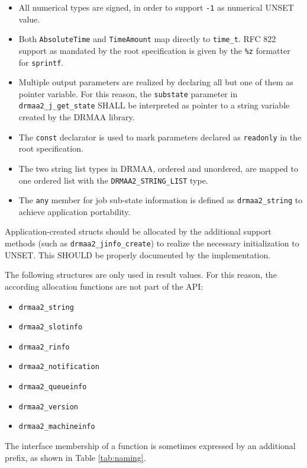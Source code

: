 \documentclass{article}
\newcommand{\h}[1]{\texttt{#1}}
\begin{document}
\begin{itemize}
\item  All numerical types are signed, in order to support \h{-1} as numerical UNSET value.
\item Both \h{AbsoluteTime} and \h{TimeAmount} map directly to \h{time\_t}. RFC 822 support as mandated by the root specification is given by the \h{\%z} formatter for \h{sprintf}.
\item Multiple output parameters are realized by declaring all but one of them as pointer variable. For this reason, the \h{substate} parameter in \h{drmaa2\_j\_get\_state} SHALL be interpreted as pointer to a string variable created by the DRMAA library.
\item The \h{const} declarator is used to mark parameters declared as \h{readonly} in the root specification.
\item The two string list types in DRMAA, ordered and unordered, are mapped to one ordered list with the \h{DRMAA2\_STRING\_LIST} type.
\item The \h{any} member for job sub-state information is defined as \h{drmaa2\_string} to achieve application portability.
\end{itemize}

Application-created structs should be allocated by the additional support methods (such as \h{drmaa2\_jinfo\_create}) to realize the necessary initialization to UNSET. This SHOULD be properly documented by the implementation.

The following structures are only used in result values. For this reason, the according allocation functions are not part of the API:

\begin{itemize}
\item \h{drmaa2\_string}
\item \h{drmaa2\_slotinfo}
\item \h{drmaa2\_rinfo}
\item \h{drmaa2\_notification}
\item \h{drmaa2\_queueinfo}
\item \h{drmaa2\_version}
\item \h{drmaa2\_machineinfo}
\end{itemize}

The interface membership of a function is sometimes expressed by an additional prefix, as shown in Table \ref{tab:naming}.
\end{document}
